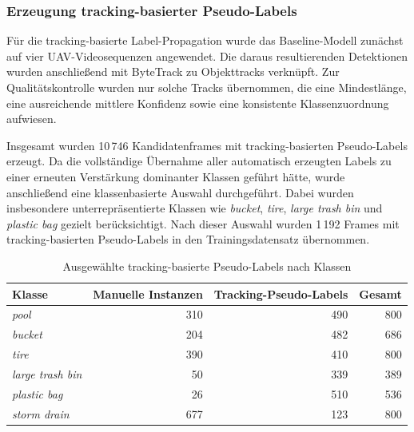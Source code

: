 \subsubsection{Erzeugung tracking-basierter Pseudo-Labels}

Für die tracking-basierte Label-Propagation wurde das Baseline-Modell zunächst
auf vier UAV-Videosequenzen angewendet. Die daraus resultierenden Detektionen
wurden anschließend mit ByteTrack zu Objekttracks verknüpft. Zur Qualitätskontrolle
wurden nur solche Tracks übernommen, die eine Mindestlänge, eine ausreichende
mittlere Konfidenz sowie eine konsistente Klassenzuordnung aufwiesen.

Insgesamt wurden 10\,746 Kandidatenframes mit tracking-basierten Pseudo-Labels
erzeugt. Da die vollständige Übernahme aller automatisch erzeugten Labels zu einer
erneuten Verstärkung dominanter Klassen geführt hätte, wurde anschließend eine
klassenbasierte Auswahl durchgeführt. Dabei wurden insbesondere unterrepräsentierte
Klassen wie \textit{bucket}, \textit{tire}, \textit{large trash bin} und
\textit{plastic bag} gezielt berücksichtigt. Nach dieser Auswahl wurden 1\,192 Frames
mit tracking-basierten Pseudo-Labels in den Trainingsdatensatz übernommen.

\begin{table}[H]
    \centering
    \caption{Ausgewählte tracking-basierte Pseudo-Labels nach Klassen}
    \label{tab:tracking_pseudo_distribution}
    \begin{tabular}{lrrr}
        \hline
        \textbf{Klasse}          & \textbf{Manuelle Instanzen} & \textbf{Tracking-Pseudo-Labels} & \textbf{Gesamt} \\
        \hline
        \textit{pool}            & 310                         & 490                             & 800             \\
        \textit{bucket}          & 204                         & 482                             & 686             \\
        \textit{tire}            & 390                         & 410                             & 800             \\
        \textit{large trash bin} & 50                          & 339                             & 389             \\
        \textit{plastic bag}     & 26                          & 510                             & 536             \\
        \textit{storm drain}     & 677                         & 123                             & 800             \\
        \hline
    \end{tabular}
\end{table}


